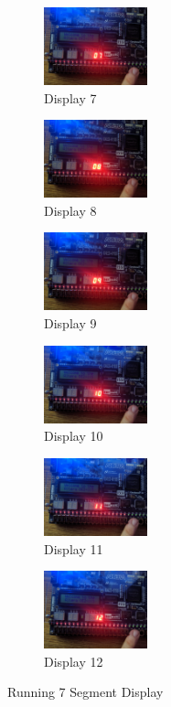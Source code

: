 \documentclass[10pt,a4paper]{article}
\begin{document}
\begin{figure}[H]
\begin{subfigure}{3cm}
			\end{subfigure}	
			\begin{subfigure}{3cm}
				\centering\includegraphics[width=3cm]{Display7.jpg}
				\caption{Display 7}
			\end{subfigure}	
			\begin{subfigure}{3cm}
				\centering\includegraphics[width=3cm]{Display8.jpg}
				\caption{Display 8}
			\end{subfigure}
			\begin{subfigure}{3cm}
				\centering\includegraphics[width=3cm]{Display9.jpg}
				\caption{Display 9}
				
			\end{subfigure}					
			\begin{subfigure}{3cm}
				\centering\includegraphics[width=3cm]{Display10.jpg}
				\caption{Display 10}
			\end{subfigure}	
			\begin{subfigure}{3cm}
				\centering\includegraphics[width=3cm]{Display11.jpg}
				\caption{Display 11}
			\end{subfigure}
			\begin{subfigure}{3cm}
				\centering\includegraphics[width=3cm]{Display12.jpg}
				\caption{Display 12}
			\end{subfigure}	
			
			\label{fig:disp}
			\caption{Running 7 Segment Display}
		\end{figure}
\end{document}
